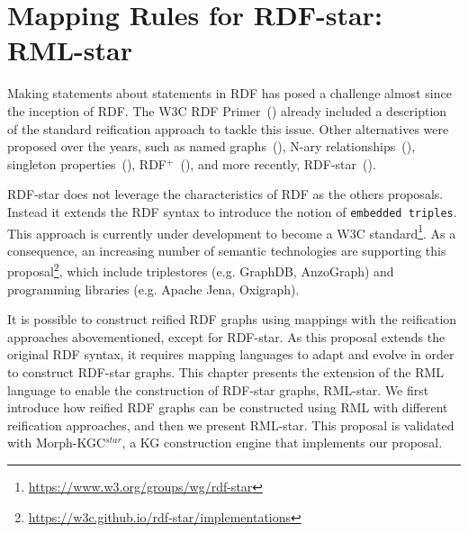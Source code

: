 \section{Mapping Rules for RDF-star: RML-star}
\label{sec:chp4_rml_star}




Making statements about statements in RDF has
posed a challenge almost since the inception of RDF.
The W3C RDF Primer~(\cite{manola2004rdf}) already included a description of the standard reification approach to tackle this issue.
Other alternatives were proposed over the years,
such as named graphs~(\cite{carroll2005namedgraphs}), N-ary relationships~(\cite{naryw3c2006}), singleton properties~(\cite{nguyen2014don}), RDF$^+$~(\cite{schueler2008querying}), and more recently, \mbox{RDF-star}~(\cite{hartig2017foundations}). 

RDF-star does not leverage the characteristics of RDF as the others proposals. Instead it extends the RDF syntax to introduce the notion of \texttt{embedded triples}. This approach is currently under development to become a W3C standard\footnote{\url{https://www.w3.org/groups/wg/rdf-star}}. 
As a consequence, an increasing number of semantic technologies are supporting this proposal\footnote{\url{https://w3c.github.io/rdf-star/implementations}}, which include triplestores (e.g. GraphDB, AnzoGraph) and programming libraries (e.g. Apache Jena, Oxigraph).

It is possible to construct reified RDF graphs using mappings with the reification approaches abovementioned, except for RDF-star. As this proposal extends the original RDF syntax, it requires mapping languages to adapt and evolve in order to construct RDF-star graphs. This chapter presents the extension of the RML language to enable the construction of RDF-star graphs, RML-star. We first introduce how reified RDF graphs can be constructed using RML with different reification approaches, and then we present RML-star. This proposal is validated with \mbox{Morph-KGC$^{star}$}, a KG construction engine that implements our proposal.

